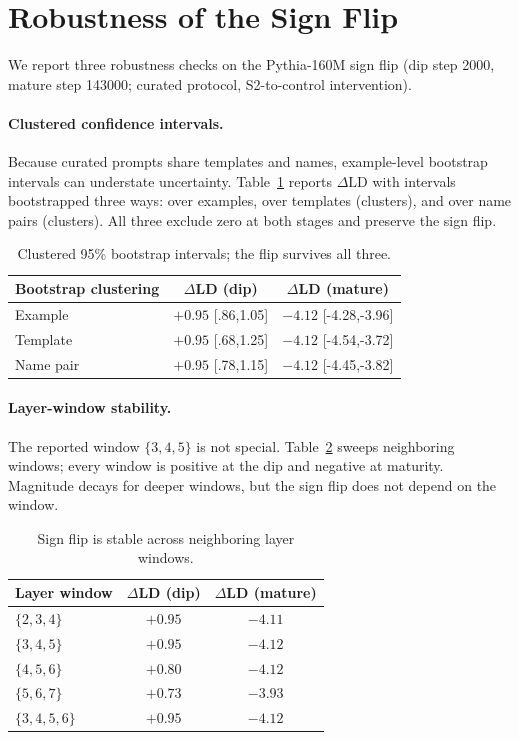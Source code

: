 \documentclass[11pt]{article}
\begin{document}
\appendix

\section{Robustness of the Sign Flip}
\label{sec:appendix}
We report three robustness checks on the Pythia-160M sign flip (dip step 2000,
mature step 143000; curated protocol, S2-to-control intervention).

\paragraph{Clustered confidence intervals.}
Because curated prompts share templates and names, example-level bootstrap
intervals can understate uncertainty. Table~\ref{tab:clustered} reports
$\Delta\mathrm{LD}$ with intervals bootstrapped three ways: over examples, over
templates (clusters), and over name pairs (clusters). All three exclude zero at
both stages and preserve the sign flip.

\begin{table}[h]
  \centering\small
  \begin{tabular}{lcc}
    \toprule
    Bootstrap clustering & $\Delta$LD (dip) & $\Delta$LD (mature) \\
    \midrule
    Example      & $+0.95$ [.86,1.05] & $-4.12$ [-4.28,-3.96] \\
    Template     & $+0.95$ [.68,1.25] & $-4.12$ [-4.54,-3.72] \\
    Name pair    & $+0.95$ [.78,1.15] & $-4.12$ [-4.45,-3.82] \\
    \bottomrule
  \end{tabular}
  \caption{Clustered 95\% bootstrap intervals; the flip survives all three.}
  \label{tab:clustered}
\end{table}

\paragraph{Layer-window stability.}
The reported window $\{3,4,5\}$ is not special. Table~\ref{tab:windows} sweeps
neighboring windows; every window is positive at the dip and negative at
maturity. Magnitude decays for deeper windows, but the sign flip does not depend
on the window.

\begin{table}[h]
  \centering\small
  \begin{tabular}{lcc}
    \toprule
    Layer window & $\Delta$LD (dip) & $\Delta$LD (mature) \\
    \midrule
    $\{2,3,4\}$   & $+0.95$ & $-4.11$ \\
    $\{3,4,5\}$   & $+0.95$ & $-4.12$ \\
    $\{4,5,6\}$   & $+0.80$ & $-4.12$ \\
    $\{5,6,7\}$   & $+0.73$ & $-3.93$ \\
    $\{3,4,5,6\}$ & $+0.95$ & $-4.12$ \\
    \bottomrule
  \end{tabular}
  \caption{Sign flip is stable across neighboring layer windows.}
  \label{tab:windows}
\end{table}
\end{document}
